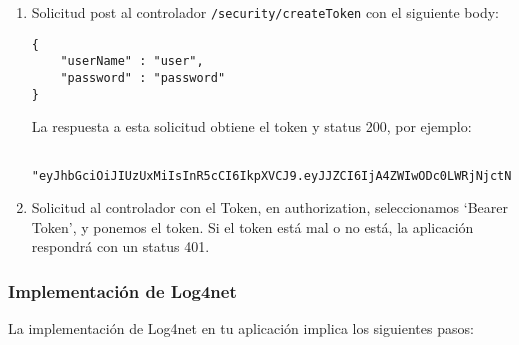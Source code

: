 \documentclass[executivepaper]{article}
\begin{document}
\begin{enumerate}
    \item Solicitud post al controlador \lstinline{/security/createToken} con el siguiente body:
    \begin{lstlisting}
{
    "userName" : "user",
    "password" : "password"
}
\end{lstlisting}
La respuesta a esta solicitud obtiene el token y status 200, por ejemplo:
\begin{lstlisting}
    "eyJhbGciOiJIUzUxMiIsInR5cCI6IkpXVCJ9.eyJJZCI6IjA4ZWIwODc0LWRjNjctNDFhMS1YiI6InVzZXIiLCJlbWFpMTUtOWYxOC.0yMDVlMjhkYTdmMzMiLCJuYmYiOjE2ODkyMDEzOczovL2pveWRpcGthbmppbGFsLmNvbS8pcGthbmppbGFsLmNvbS8ifQ.PZrQGkqDWmu_zPm7m9gbyMDJ4_1zEic6_UPl7cHVUBdX8pon8NstYCXctAibL6rIClcVok4tXLwpzYuGoJAtlA"
\end{lstlisting}
\item Solicitud al controlador con el Token, en authorization, seleccionamos \enquote*{Bearer Token}, y ponemos el token. Si el token está mal o no está, la aplicación respondrá con un status 401.
\end{enumerate}

\subsubsection{Implementación de Log4net}

La implementación de Log4net en tu aplicación implica los siguientes pasos:
\end{document}
